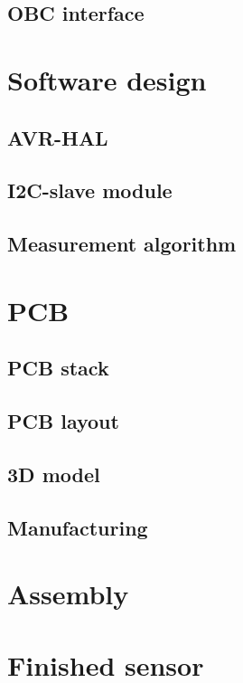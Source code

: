 \subsection{OBC interface}

\section{Software design}
\subsection{AVR-HAL}
\subsection{I2C-slave module}
\subsection{Measurement algorithm}

\section{PCB}
\subsection{PCB stack}
\subsection{PCB layout}
\subsection{3D model}
\subsection{Manufacturing}

\section{Assembly}

\section{Finished sensor}
